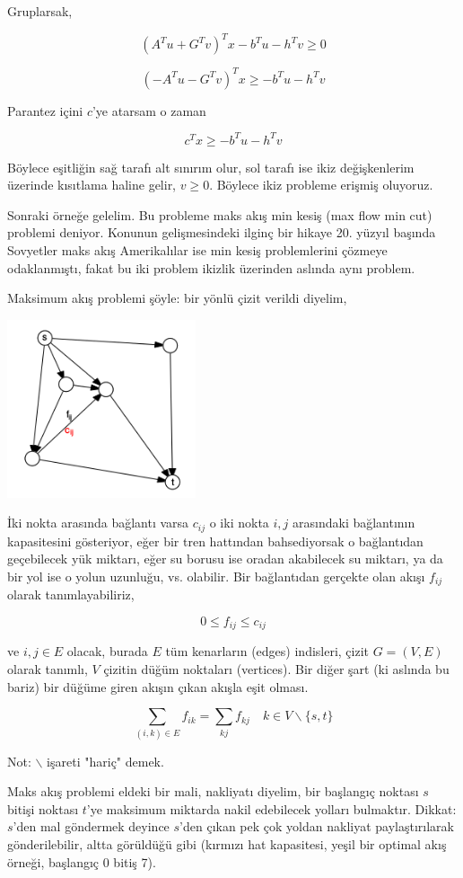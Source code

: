 \documentclass[12pt,fleqn]{article}\usepackage{../../common}
\begin{document}
Gruplarsak,

$$
(A^T u + G^T v)^T x - b^Tu - h^T v \ge 0
$$

$$
(-A^T u - G^T v)^T x \ge  -b^Tu - h^T v 
$$

Parantez içini $c$'ye atarsam o zaman 

$$
c^T x \ge  -b^Tu - h^T v 
$$

Böylece eşitliğin sağ tarafı alt sınırım olur, sol tarafı ise ikiz
değişkenlerim üzerinde kısıtlama haline gelir, $v \ge 0$. Böylece ikiz
probleme erişmiş oluyoruz.

Sonraki örneğe gelelim. Bu probleme maks akış min kesiş (max flow min cut)
problemi deniyor. Konunun gelişmesindeki ilginç bir hikaye 20. yüzyıl
başında Sovyetler maks akış Amerikalılar ise min kesiş problemlerini
çözmeye odaklanmıştı, fakat bu iki problem ikizlik üzerinden aslında aynı
problem.

Maksimum akış problemi şöyle: bir yönlü çizit verildi diyelim,

\includegraphics[width=15em]{func_55_duality_01.png}

İki nokta arasında bağlantı varsa $c_{ij}$ o iki nokta $i,j$ arasındaki
bağlantının kapasitesini gösteriyor, eğer bir tren hattından bahsediyorsak
o bağlantıdan geçebilecek yük miktarı, eğer su borusu ise oradan akabilecek
su miktarı, ya da bir yol ise o yolun uzunluğu, vs. olabilir. Bir
bağlantıdan gerçekte olan akışı $f_{ij}$ olarak tanımlayabiliriz,

$$
0 \le f_{ij} \le c_{ij}
$$

ve $i,j \in E$ olacak, burada $E$ tüm kenarların (edges) indisleri, çizit
$G = (V,E)$ olarak tanımlı, $V$ çizitin düğüm noktaları (vertices). Bir
diğer şart (ki aslında bu bariz) bir düğüme giren akışın çıkan akışla eşit
olması. 

$$
\sum_{(i,k) \in E} f_{ik} = \sum_{kj} f_{kj} \quad k \in V \backslash \{s,t\} 
$$

Not: $\backslash$ işareti "hariç" demek. 

Maks akış problemi eldeki bir mali, nakliyatı diyelim, bir başlangıç
noktası $s$ bitişi noktası $t$'ye maksimum miktarda nakil edebilecek yolları
bulmaktır. Dikkat: $s$'den mal göndermek deyince $s$'den çıkan pek çok
yoldan nakliyat paylaştırılarak gönderilebilir, altta görüldüğü gibi
(kırmızı hat kapasitesi, yeşil bir optimal akış örneği, başlangıç 0 bitiş
7).
\end{document}
